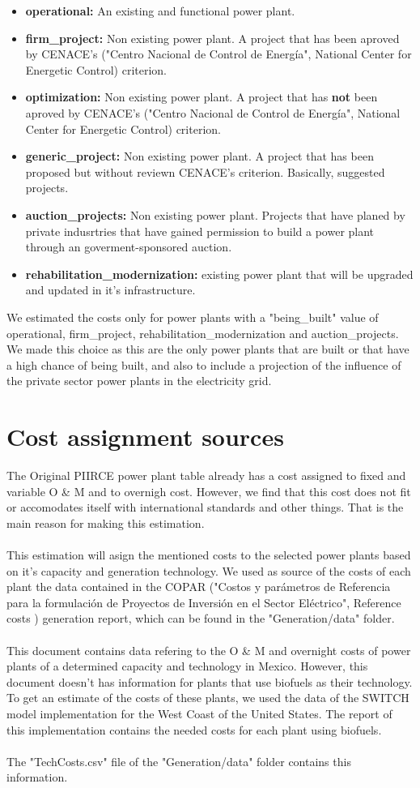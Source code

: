 \documentclass[letterpaper,12pt]{article}
\begin{document}
\begin{itemize}
\item \textbf{operational: } An existing and functional power plant.
\item \textbf{firm\_project:} Non existing power plant. A project that has been aproved by CENACE's ("Centro Nacional de Control de Energía", National Center for Energetic Control) criterion.
\item \textbf{optimization:} Non existing power plant. A project that has \textbf{not} been aproved by CENACE's ("Centro Nacional de Control de Energía", National Center for Energetic Control) criterion.
\item \textbf{generic\_project:} Non existing power plant. A project that has been proposed but without reviewn CENACE's criterion. Basically, suggested projects.
\item \textbf{auction\_projects:} Non existing power plant. Projects that have planed by private indusrtries that have gained permission to build a power plant through an goverment-sponsored auction.
\item \textbf{rehabilitation\_modernization:} existing power plant that will be upgraded and updated in it's infrastructure.
\end{itemize}
We estimated the costs only for power plants with a "being\_built" value of operational, firm\_project, rehabilitation\_modernization and auction\_projects. We made this choice as this are the only power plants that are built or that have a high chance of being built, and also to include a projection of the influence of the private sector power plants in the electricity grid.
\section{Cost assignment sources}
The Original PIIRCE power plant table already has a cost assigned to fixed and variable O \& M and to overnigh cost. However, we find that this cost does not fit or accomodates itself with international standards and other things. That is the main reason for making this estimation.
\\
\\This estimation will asign the mentioned costs to the selected power plants based on it's capacity and generation technology. We used as source of the costs of each plant the data contained in the COPAR ("Costos y parámetros de Referencia para la formulación de Proyectos de Inversión en el Sector Eléctrico", Reference costs ) generation report, which can be found in the "Generation/data" folder\cite{copar}.
\\
\\This document contains data refering to the O \& M and overnight costs of power plants of a determined capacity and technology in Mexico. However, this document doesn't has information for plants that use biofuels as their technology. To get an estimate of the costs of these plants, we used the data of the SWITCH model implementation for the West Coast of the United States. The report\cite{us} of this implementation contains the needed costs for each plant using biofuels.
\\
\\The "TechCosts.csv" file of the "Generation/data" folder contains this information.
\end{document}
